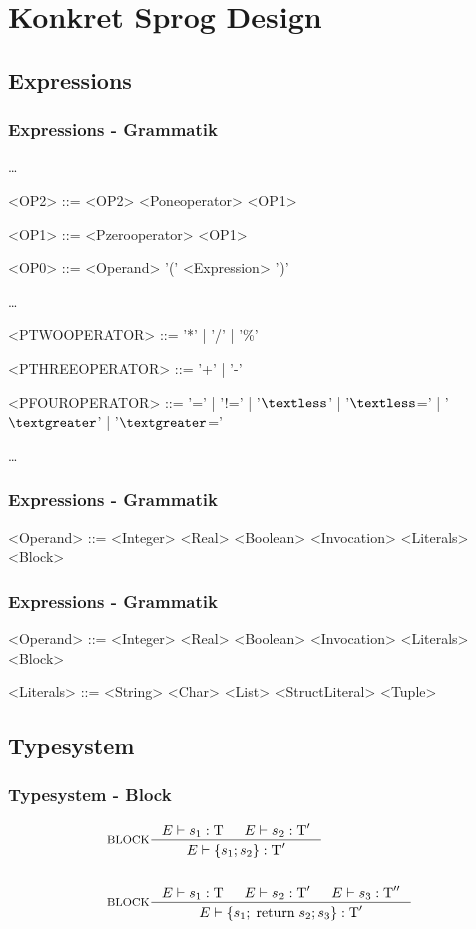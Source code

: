 \section{Konkret Sprog Design}
\setlength{\grammarindent}{100pt}
\subsection{Expressions}
\begin{frame}
	\frametitle{Expressions - Grammatik}
	\dots
	\begin{grammar}
	<OP2> ::= <OP2> <Poneoperator> <OP1>
  
	<OP1> ::= <Pzerooperator> <OP1>

  <OP0> ::= <Operand>
  \alt '(' <Expression> ')'
  \end{grammar}
	\dots
	\begin{grammar}
	<PTWOOPERATOR> ::= '*' | '/' | '\%'
	
	<PTHREEOPERATOR> ::= '+' | '-'
	
	<PFOUROPERATOR> ::= '=' | '!=' | '$\textless$' | '$\textless$=' | '$\textgreater$' | '$\textgreater$='
	\end{grammar}
	\dots
\end{frame}

\begin{frame}
	\frametitle{Expressions - Grammatik}
	\begin{grammar}
  <Operand> ::= <Integer>
    \alt <Real>
    \alt <Boolean>
    \alt <Invocation>
    \alt <Literals>
		\alt <Block>
  \end{grammar}
\end{frame}

\begin{frame}
	\frametitle{Expressions - Grammatik}
	\begin{grammar}
  <Operand> ::= <Integer>
    \alt <Real>
    \alt <Boolean>
    \alt <Invocation>
    \alt <Literals>
		\alt <Block>
		
	<Literals> ::= <String>
    \alt <Char>
    \alt <List>
    \alt <StructLiteral>
    \alt <Tuple>
  \end{grammar}
\end{frame}

\subsection{Typesystem}
\begin{frame}
	\frametitle{Typesystem - Block}
	\begin{align*}
  &\inference[BLOCK]{\Tenv s_1: \Tt & \Tenv s_2: \Tt'}
                    {\Tenv \{s_1; s_2\} : \Tt'}
	\\\\
  &\inference[BLOCK]{\Tenv s_1: \Tt & \Tenv s_2: \Tt' & \Tenv s_3: \Tt''}
                    {\Tenv \{s_1; \;\Treturn\; s_2; s_3\} : \Tt'}
  \end{align*}
\end{frame}

